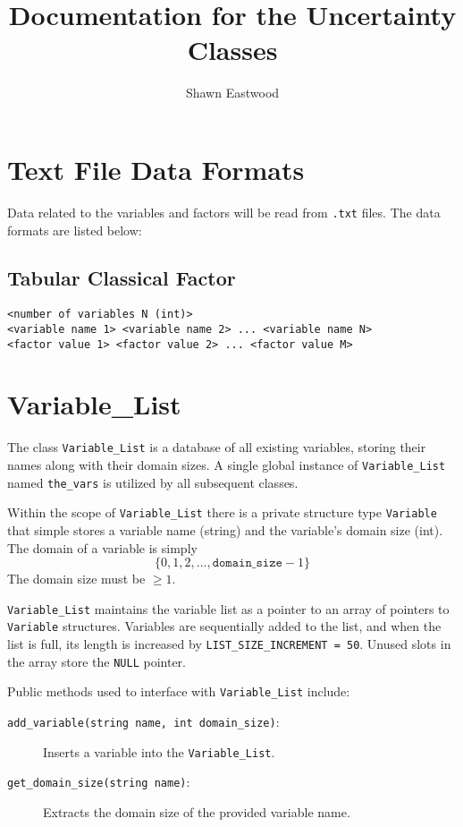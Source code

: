 \documentclass{article}
\title{Documentation for the Uncertainty Classes}
\author{Shawn Eastwood}
\date{}
\begin{document}
\maketitle

\section{Text File Data Formats}

Data related to the variables and factors will be read from \texttt{.txt} files. The data formats are listed below:


\subsection{Tabular Classical Factor}

\begin{verbatim}
<number of variables N (int)>
<variable name 1> <variable name 2> ... <variable name N>
<factor value 1> <factor value 2> ... <factor value M>
\end{verbatim}


\section{Variable\_List}

The class \texttt{Variable\_List} is a database of all existing variables, storing their names along with their domain sizes. A single global instance of \texttt{Variable\_List} named \texttt{the\_vars} is utilized by all subsequent classes.

Within the scope of \texttt{Variable\_List} there is a private structure type \texttt{Variable} that simple stores a variable name (string) and the variable's domain size (int). The domain of a variable is simply \[\{0, 1, 2, \dots, \texttt{domain\_size} - 1\}\] The domain size must be \(\geq 1\).

\texttt{Variable\_List} maintains the variable list as a pointer to an array of pointers to \texttt{Variable} structures. Variables are sequentially added to the list, and when the list is full, its length is increased by \texttt{LIST\_SIZE\_INCREMENT = 50}. Unused slots in the array store the \texttt{NULL} pointer. 

Public methods used to interface with \texttt{Variable\_List} include:

\begin{description}
\item[\texttt{add\_variable(string name, int domain\_size)}:] Inserts a variable into the \texttt{Variable\_List}. 
\item[\texttt{get\_domain\_size(string name)}:] Extracts the domain size of the provided variable name.
\end{description}
\end{document}
